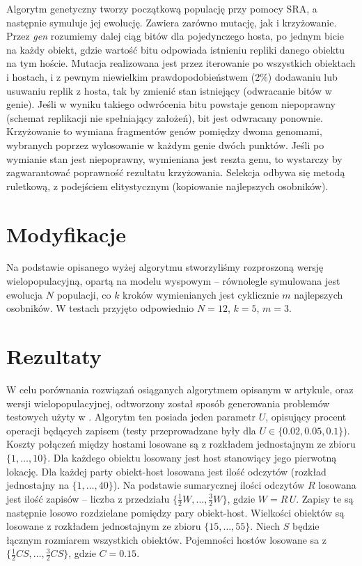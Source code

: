 \documentclass[11pt,pdftex,a4paper]{scrartcl}
\begin{document}
Algorytm genetyczny tworzy początkową populację przy pomocy SRA, a następnie symuluje jej ewolucję.
Zawiera zarówno mutację, jak i krzyżowanie. Przez \emph{gen} rozumiemy dalej ciąg bitów dla 
pojedynczego hosta, po jednym bicie na każdy obiekt, gdzie wartość bitu odpowiada istnieniu repliki
danego obiektu na tym hoście. Mutacja realizowana jest przez iterowanie po wszystkich obiektach 
i hostach, i z pewnym niewielkim prawdopodobieństwem (2\%) dodawaniu lub usuwaniu replik z hosta, 
tak by zmienić stan istniejący (odwracanie bitów w genie). Jeśli w wyniku takiego odwrócenia bitu
powstaje genom niepoprawny (schemat replikacji nie spełniający założeń), bit jest odwracany ponownie. 
Krzyżowanie to wymiana fragmentów genów pomiędzy dwoma genomami, wybranych poprzez wylosowanie w 
każdym genie dwóch punktów. Jeśli po wymianie stan jest niepoprawny, wymieniana jest reszta genu,
to wystarczy by zagwarantować poprawność rezultatu krzyżowania. Selekcja odbywa się metodą ruletkową,
z podejściem elitystycznym (kopiowanie najlepszych osobników).

\section{Modyfikacje}
Na podstawie opisanego wyżej algorytmu stworzyliśmy rozproszoną wersję wielopopulacyjną, opartą na 
modelu wyspowym -- równolegle symulowana jest ewolucja \(N\) populacji, co \(k\) kroków wymienianych 
jest cyklicznie \(m\) najlepszych osobników. W testach przyjęto odpowiednio \(N=12\), \(k=5\),
\(m=3\).

\section{Rezultaty}
W celu porównania rozwiązań osiąganych algorytmem opisanym w artykule, oraz wersji wielopopulacyjnej,
odtworzony został sposób generowania problemów testowych użyty w \cite{Ahmad}. Algorytm ten posiada
jeden parametr \(U\), opisujący procent operacji będących zapisem (testy przeprowadzane były dla 
\(U\in\{0.02, 0.05, 0.1\}\)). Koszty połączeń między hostami 
losowane są z rozkładem jednostajnym ze zbioru \(\{1,\ldots,10\}\). Dla każdego obiektu losowany
jest host stanowiący jego pierwotną lokację. Dla każdej party obiekt-host losowana jest ilość odczytów
(rozkład jednostajny na \(\{1,\ldots,40\}\)). Na podstawie sumarycznej ilości odczytów \(R\) losowana
jest ilość zapisów -- liczba z przedziału \(\{\frac{1}{2}W,\ldots,\frac{3}{2}W\}\), gdzie 
\(W = R\,U\). Zapisy te są następnie losowo rozdzielane pomiędzy pary obiekt-host. Wielkości obiektów
są losowane z rozkładem jednostajnym ze zbioru \(\{15,\ldots,55\}\). Niech \(S\) będzie łącznym 
rozmiarem wszystkich obiektów. Pojemności hostów losowane sa z 
\(\{\frac{1}{2}CS,\ldots,\frac{3}{2}CS\}\), gdzie \(C=0.15\).
\end{document}
